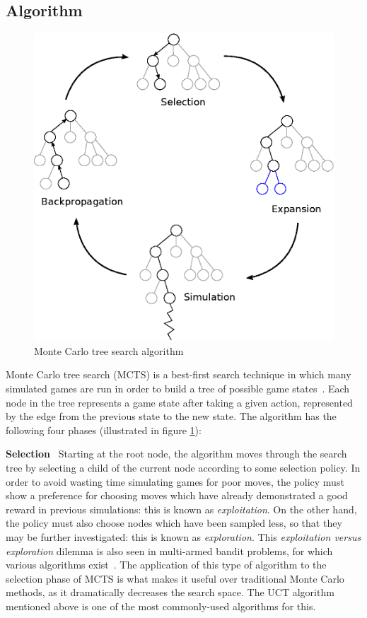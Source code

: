 \subsection{Algorithm}

\begin{figure}[ht]
\centering
\includegraphics[width=0.5\linewidth]{diagrams/mcts}
\caption{Monte Carlo tree search algorithm}
\label{fig:MCTS}
\end{figure}

Monte Carlo tree search (MCTS) is a best-first search technique in which many simulated games are run in order to build a tree of possible game states~\citep{Chaslot2008}.  Each node in the tree represents a game state after taking a given action, represented by the edge from the previous state to the new state.  The algorithm has the following four phases (illustrated in figure \ref{fig:MCTS}):

\textbf{Selection} ~Starting at the root node, the algorithm moves through the search tree by selecting a child of the current node according to some selection policy.  In order to avoid wasting time simulating games for poor moves, the policy must show a preference for choosing moves which have already demonstrated a good reward in previous simulations: this is known as \emph{exploitation}.  On the other hand, the policy must also choose nodes which have been sampled less, so that they may be further investigated: this is known as \emph{exploration}.  This \emph{exploitation versus exploration} dilemma is also seen in multi-armed bandit problems, for which various algorithms exist~\citep{Auer2002}.  The application of this type of algorithm to the selection phase of MCTS is what makes it useful over traditional Monte Carlo methods, as it dramatically decreases the search space.  The UCT algorithm~\citep{Kocsis2006} mentioned above is one of the most commonly-used algorithms for this.

